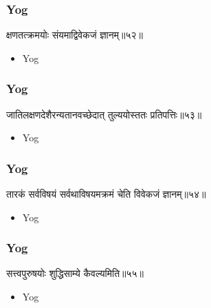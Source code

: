 \begin{frame}[fragile]\frametitle{Yog}
\begin{sanskrit}
क्षणतत्क्रमयोः संयमाद्विवेकजं ज्ञानम्॥५२॥
\end{sanskrit}
	\begin{itemize}
	\item Yog 
	\end{itemize}
\end{frame}


\begin{frame}[fragile]\frametitle{Yog}
\begin{sanskrit}
जातिलक्षणदेशैरन्यतानवच्छेदात् तुल्ययोस्ततः प्रतिपत्तिः॥५३॥
\end{sanskrit}
	\begin{itemize}
	\item Yog 
	\end{itemize}
\end{frame}


\begin{frame}[fragile]\frametitle{Yog}
\begin{sanskrit}
तारकं सर्वविषयं सर्वथाविषयमक्रमं चेति विवेकजं ज्ञानम्॥५४॥
\end{sanskrit}
	\begin{itemize}
	\item Yog 
	\end{itemize}
\end{frame}

\begin{frame}[fragile]\frametitle{Yog}
\begin{sanskrit}
सत्त्वपुरुषयोः शुद्धिसाम्ये कैवल्यमिति॥५५॥
\end{sanskrit}
	\begin{itemize}
	\item Yog 
	\end{itemize}
\end{frame}

